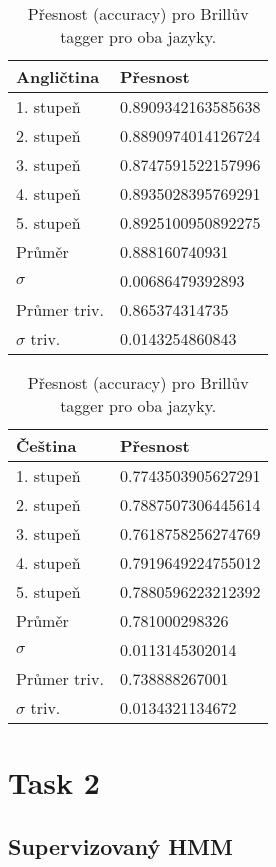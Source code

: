\documentclass[a4paper, 10.5pt]{article}
\begin{document}
\begin{table}[H]
\centering
\begin{tabular}{ll}
\toprule
\textbf{Angličtina} & \textbf{Přesnost} \\
\midrule
1. stupeň & 0.8909342163585638 \\
2. stupeň & 0.8890974014126724 \\
3. stupeň & 0.8747591522157996 \\
4. stupeň & 0.8935028395769291 \\
5. stupeň & 0.8925100950892275 \\
\midrule
Průměr   & 0.888160740931 \\
$\sigma$ & 0.00686479392893 \\
\midrule
Průmer triv. & 0.865374314735\\
$\sigma$ triv. & 0.0143254860843 \\
\bottomrule
\end{tabular}
\hskip 50pt
\begin{tabular}{ll}
\toprule
\textbf {Čeština} & \textbf{Přesnost} \\
\midrule
1. stupeň & 0.7743503905627291 \\
2. stupeň & 0.7887507306445614 \\
3. stupeň & 0.7618758256274769 \\
4. stupeň & 0.7919649224755012 \\
5. stupeň & 0.7880596223212392 \\
\midrule
Průměr   & 0.781000298326 \\
$\sigma$ & 0.0113145302014 \\
\midrule
Průmer triv. & 0.738888267001\\
$\sigma$ triv. & 0.0134321134672 \\
\bottomrule
\end{tabular}
\caption{Přesnost (accuracy) pro Brillův tagger pro oba jazyky.}
\label{eng_big}
\end{table}

\section*{Task 2}

\subsection*{Supervizovaný HMM}
\end{document}
